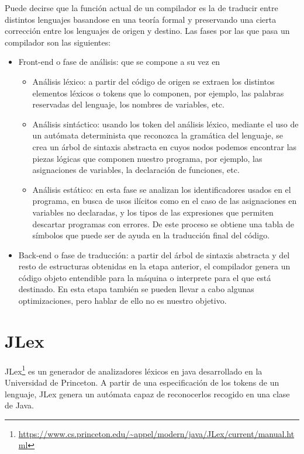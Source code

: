 Puede decirse que la función actual de un compilador es la de traducir entre distintos lenguajes basandose en una teoría formal y preservando una cierta corrección entre los lenguajes de origen y destino. Las fases por las que pasa un compilador son las siguientes:
\begin{itemize}
\item Front-end o fase de análisis: que se compone a su vez en
  \begin{itemize}
  \item Análisis léxico: a partir del código de origen se extraen los distintos elementos léxicos o tokens que lo componen, por ejemplo, las palabras reservadas del lenguaje, los nombres de variables, etc.
  \item Análisis sintáctico: usando los token del análisis léxico, mediante el uso de un autómata determinista que reconozca la gramática del lenguaje, se crea un árbol de sintaxis abstracta en cuyos nodos podemos encontrar las piezas lógicas que componen nuestro programa, por ejemplo, las asignaciones de variables, la declaración de funciones, etc.
  \item Análisis estático: en esta fase se analizan los identificadores usados en el programa, en busca de usos ilícitos como en el caso de las asignaciones en variables no declaradas, y los tipos de las expresiones que permiten descartar programas con errores. De este proceso se obtiene una tabla de símbolos que puede ser de ayuda en la traducción final del código.
  \end{itemize}
\item Back-end o fase de traducción: a partir del árbol de sintaxis abstracta y del resto de estructuras obtenidas en la etapa anterior, el compilador genera un código objeto entendible para la máquina o interprete para el que está destinado. En esta etapa también se pueden llevar a cabo algunas optimizaciones, pero hablar de ello no es nuestro objetivo.
\end{itemize}

\section{JLex}

JLex\footnote{\url{https://www.cs.princeton.edu/~appel/modern/java/JLex/current/manual.html}} es un generador de analizadores léxicos en java desarrollado en la Universidad de Princeton. A partir de una especificación de los tokens de un lenguaje, JLex genera un autómata capaz de reconocerlos recogido en una clase de Java.\\

